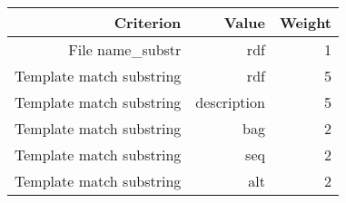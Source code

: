 \begin{tabular}{|r|r|r|}
\hline
\bf Criterion&\bf Value&\bf Weight\\
\hline
File name_substr&rdf&1\\
\hline
Template match substring&rdf&5\\
\hline
Template match substring&description&5\\
\hline
Template match substring&bag&2\\
\hline
Template match substring&seq&2\\
\hline
Template match substring&alt&2\\
\hline
\end{tabular}
